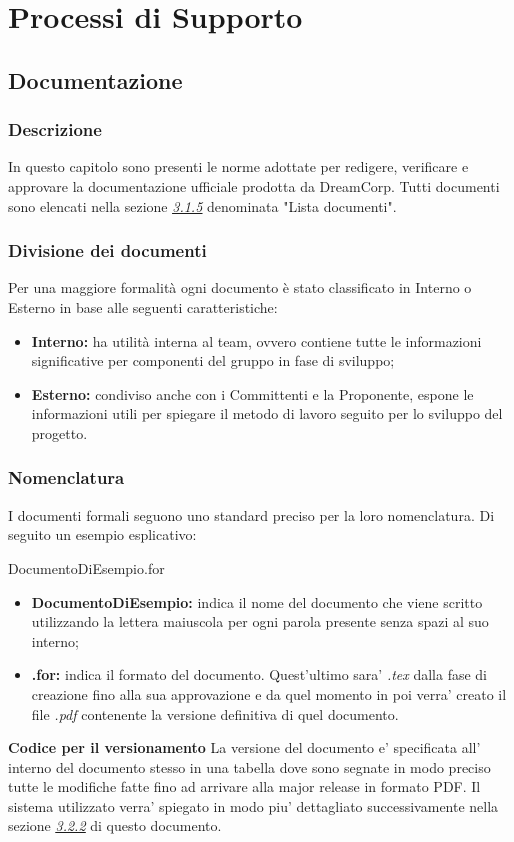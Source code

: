 \section{Processi di Supporto}

	\subsection{Documentazione}
		\subsubsection{Descrizione}
			In questo capitolo sono presenti le norme adottate per 					redigere, verificare e approvare la documentazione 						ufficiale prodotta da DreamCorp. Tutti documenti sono 					elencati nella sezione \hyperref[3.1.5]{\textit{\underline{3.1.5}}} denominata "Lista documenti".
		\subsubsection{Divisione dei documenti}
			Per una maggiore formalità ogni documento è stato classificato in Interno o Esterno in base alle seguenti caratteristiche:
			\begin{itemize}
				\item \textbf{Interno:} ha utilità interna al team, ovvero contiene tutte le informazioni significative per componenti del gruppo in fase di sviluppo;
				\item \textbf{Esterno:} condiviso anche con i Committenti e la Proponente, espone le informazioni utili per spiegare il metodo di lavoro seguito per lo sviluppo del progetto.
			\end{itemize}
		\subsubsection{Nomenclatura}
			I documenti formali seguono uno standard preciso per la loro nomenclatura. Di seguito un esempio esplicativo: 					\newline 
			\begin{center}
				DocumentoDiEsempio.for
			\end{center}
			\begin{itemize}
				\item \textbf{DocumentoDiEsempio:} indica il nome del documento che viene scritto utilizzando la lettera maiuscola per ogni parola presente senza spazi al suo interno;
				\item \textbf{.for:} indica il formato del documento. Quest'ultimo sara' \textit{.tex} dalla fase di creazione fino alla sua approvazione e da quel momento in poi verra' creato il file \textit{.pdf} contenente la versione definitiva di quel documento.
			\end{itemize}
			\textbf{Codice per il versionamento} La versione del documento e' specificata all' interno del documento stesso in una tabella dove sono segnate in modo preciso tutte le modifiche fatte fino ad arrivare alla major release in formato PDF. Il sistema utilizzato verra' spiegato in modo piu' dettagliato successivamente nella sezione \hyperref[3.2.2]{\textit{\underline{3.2.2}}} di questo documento.
